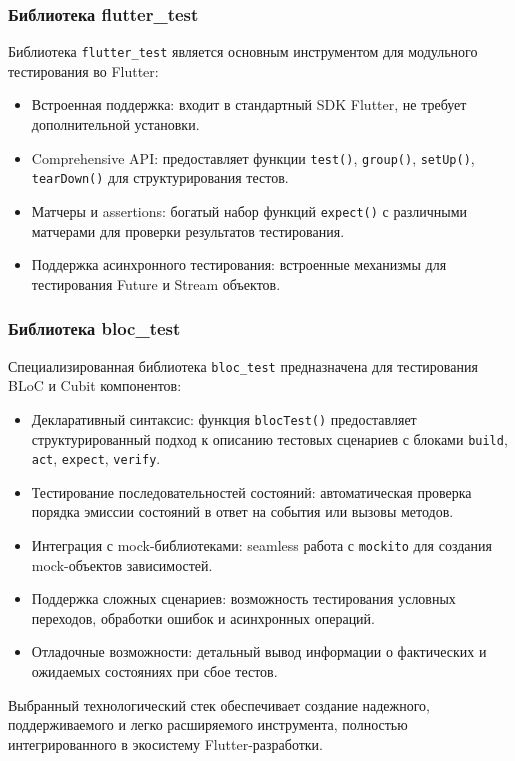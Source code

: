 \documentclass[14pt, russian]{scrartcl}
\begin{document}
\subsubsection{Библиотека flutter\_test}

Библиотека \texttt{flutter\_test} является основным инструментом для модульного тестирования во Flutter:
\begin{itemize}
    \item Встроенная поддержка: входит в стандартный SDK Flutter, не требует дополнительной установки.
    \item Comprehensive API: предоставляет функции \texttt{test()}, \texttt{group()}, \texttt{setUp()}, \texttt{tearDown()} для структурирования тестов.
    \item Матчеры и assertions: богатый набор функций \texttt{expect()} с различными матчерами для проверки результатов тестирования.
    \item Поддержка асинхронного тестирования: встроенные механизмы для тестирования Future и Stream объектов.
\end{itemize}

\subsubsection{Библиотека bloc\_test}

Специализированная библиотека \texttt{bloc\_test} предназначена для тестирования BLoC и Cubit компонентов:
\begin{itemize}
    \item Декларативный синтаксис: функция \texttt{blocTest()} предоставляет структурированный подход к описанию тестовых сценариев с блоками \texttt{build}, \texttt{act}, \texttt{expect}, \texttt{verify}.
    \item Тестирование последовательностей состояний: автоматическая проверка порядка эмиссии состояний в ответ на события или вызовы методов.
    \item Интеграция с mock-библиотеками: seamless работа с \texttt{mockito} для создания mock-объектов зависимостей.
    \item Поддержка сложных сценариев: возможность тестирования условных переходов, обработки ошибок и асинхронных операций.
    \item Отладочные возможности: детальный вывод информации о фактических и ожидаемых состояниях при сбое тестов.
\end{itemize}

Выбранный технологический стек обеспечивает создание надежного, поддерживаемого и легко расширяемого инструмента, полностью интегрированного в экосистему Flutter-разработки.
\end{document}
